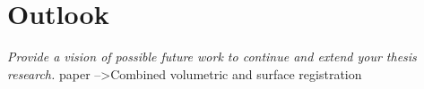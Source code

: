 %
%
%

\chapter{Outlook}

\textit{Provide a vision of possible future work to continue and extend your thesis research.}
\cite{postelnicu2009combined} paper -->Combined volumetric and surface registration

\endinput
